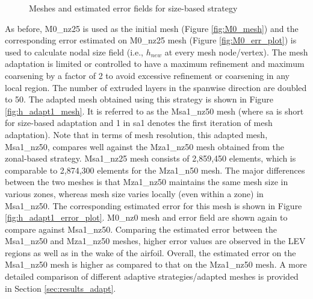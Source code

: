 \begin{figure}[H]
\caption{Meshes and estimated error fields for size-based strategy}
\end{figure}

As before, M0\_nz25 is used as the initial mesh (Figure \ref{fig:M0_mesh}) and the corresponding error estimated on M0\_nz25 mesh (Figure \ref{fig:M0_err_plot}) is used to calculate nodal size field (i.e., $h_{new}$ at every mesh node/vertex). The mesh adaptation is limited or controlled to have a maximum refinement and maximum coarsening by a factor of 2 to avoid excessive refinement or coarsening in any local region. The number of extruded layers in the spanwise direction are doubled to 50. The adapted mesh obtained using this strategy is shown in Figure \ref{fig:h_adapt1_mesh}. It is referred to as the Msa1\_nz50 mesh (where sa is short for size-based adaptation and 1 in sa1 denotes the first iteration of mesh adaptation). Note that in terms of mesh resolution, this adapted mesh, Msa1\_nz50, compares well against the Mza1\_nz50 mesh obtained from the zonal-based strategy. Msa1\_nz25 mesh consists of 2,859,450 elements, which is comparable to 2,874,300 elements for the Mza1\_n50 mesh. The major differences between the two meshes is that Mza1\_nz50 maintains the same mesh size in various zones, whereas mesh size varies locally (even within a zone) in Msa1\_nz50.
The corresponding estimated error for this mesh is shown in Figure \ref{fig:h_adapt1_error_plot}. M0\_nz0 mesh and error field are shown again to compare against Msa1\_nz50. Comparing the estimated error between the Msa1\_nz50 and Mza1\_nz50 meshes, higher error values are observed in the LEV regions as well as in the wake of the airfoil. Overall, the estimated error on the Msa1\_nz50 mesh is higher as compared to that on the Mza1\_nz50 mesh. A more detailed comparison of different adaptive strategies/adapted meshes is provided in Section \ref{sec:results_adapt}.
